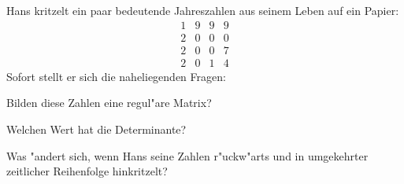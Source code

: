 Hans kritzelt ein paar bedeutende Jahreszahlen aus seinem Leben
auf ein Papier:
\[
\begin{matrix}
1&9&9&9\\
2&0&0&0\\
2&0&0&7\\
2&0&1&4
\end{matrix}
\]
Sofort stellt er sich die naheliegenden Fragen:
\begin{teilaufgaben}
\item Bilden diese Zahlen eine regul"are Matrix? 
\item Welchen Wert hat die Determinante?
\item Was "andert sich, wenn Hans seine Zahlen r"uckw"arts und in
umgekehrter zeitlicher Reihenfolge hinkritzelt?
\end{teilaufgaben}

